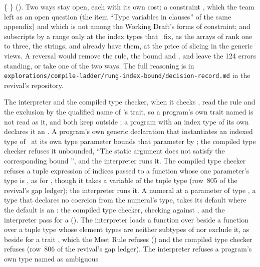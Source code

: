 \begin{description}
{ \{\,\,\}} ().
Two ways stay open, each with its own cost: a constraint
,
which the team left as an open question (the item ``Type variables in
 clauses'' of the same appendix) and which is not among the
Working Draft's forms of constraint; and subscripts by a range only at the
index types that \library\ fix, as the arrays of rank one to three, the strings,
 and  already have them, at the price of slicing in the
generic views.
A reversal would remove the rule, the bound and , and leave the 124
errors standing, or take one of the two ways.
The full reasoning is in
\nolinkurl{explorations/compile-ladder/rung-index-bound/decision-record.md} in
the revival's repository.
\item[Effect] The interpreter and the compiled type checker, when it checks
\library, read the rule and the exclusion by the qualified name of
\library's trait, so a program's own trait named  is not read as
it, and both keep  outside ; a program with an index
type of its own declares it an .
A program's own generic declaration that instantiates an indexed type of
\library\ at its own type parameter bounds that parameter by ; the
compiled type checker refuses it unbounded, ``The static argument  does
not satisfy the corresponding bound '', and the interpreter runs
it.
The compiled type checker refuses a tuple expression of indices passed to a
function whose one parameter's type is , as  for
, though it takes a variable of the tuple type
(row~805 of the revival's gap ledger); the interpreter runs it.
A numeral at a parameter of type , a type that declares no
coercion from the numeral's type, takes its default where the default is an
: the compiled type checker, checking against \library, and the
interpreter pass  for  a
 ().
The interpreter loads a function over  beside a function over a
tuple type whose element types are neither subtypes of  nor exclude
it, as  beside
 for a trait , which the Meet
Rule refuses () and the compiled type checker
refuses (row~806 of the revival's gap ledger).
The interpreter refuses a program's own type named  as ambiguous

\end{description}
